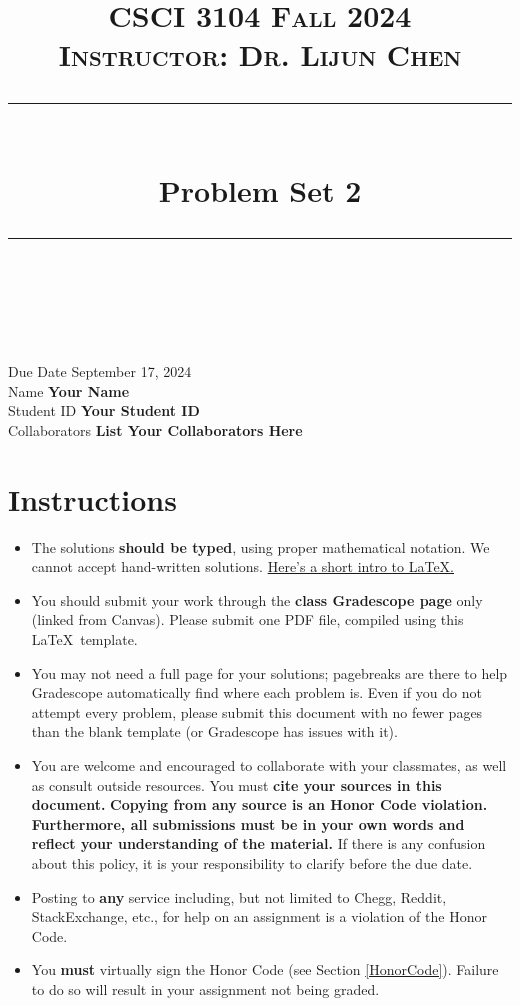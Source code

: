\documentclass[11pt]{article}
\title{
\normalfont \normalsize 
\textsc{CSCI 3104 Fall 2024 \\ 
Instructor: Dr. Lijun Chen} \\
[10pt] 
\rule{\linewidth}{0.5pt} \\[6pt] 
\huge Problem Set 2 \\
\rule{\linewidth}{2pt}  \\[10pt]
}
\date{}
\theoremstyle{definition}
\theoremstyle{definition}
\theoremstyle{definition}
\begin{document}
\maketitle


\noindent
Due Date \dotfill September 17, 2024  \\
Name \dotfill \textbf{Your Name} \\
Student ID \dotfill \textbf{Your Student ID} \\
Collaborators \dotfill \textbf{List Your Collaborators Here}

\tableofcontents

\section*{Instructions}
 \begin{itemize}
	\item The solutions \textbf{should be typed}, using proper mathematical notation. We cannot accept hand-written solutions. \href{http://ece.uprm.edu/~caceros/latex/introduction.pdf}{Here's a short intro to \LaTeX.}
	\item You should submit your work through the \textbf{class Gradescope page} only (linked from Canvas). Please submit one PDF file, compiled using this \LaTeX \ template.
	\item You may not need a full page for your solutions; pagebreaks are there to help Gradescope automatically find where each problem is. Even if you do not attempt every problem, please submit this document with no fewer pages than the blank template (or Gradescope has issues with it).

	\item You are welcome and encouraged to collaborate with your classmates, as well as consult outside resources. You must \textbf{cite your sources in this document.} \textbf{Copying from any source is an Honor Code violation. Furthermore, all submissions must be in your own words and reflect your understanding of the material.} If there is any confusion about this policy, it is your responsibility to clarify before the due date. 

	\item Posting to \textbf{any} service including, but not limited to Chegg, Reddit, StackExchange, etc., for help on an assignment is a violation of the Honor Code.

	\item You \textbf{must} virtually sign the Honor Code (see Section \ref{HonorCode}). Failure to do so will result in your assignment not being graded.
\end{itemize}
\end{document}
